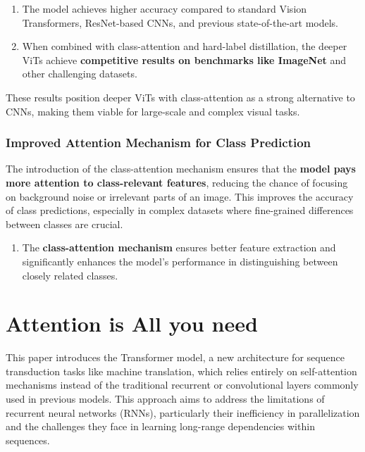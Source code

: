 \documentclass{report}
\begin{document}
	\begin{enumerate}
		\item 
		The model achieves higher accuracy compared to standard Vision Transformers, ResNet-based CNNs, and previous state-of-the-art models.
		
		\item 
		When combined with class-attention and hard-label distillation, the deeper ViTs achieve \textbf{competitive results on benchmarks like ImageNet} and other challenging datasets.
	\end{enumerate}
	These results position deeper ViTs with class-attention as a strong alternative to CNNs, making them viable for large-scale and complex visual tasks.
	
	
	
	\subsection{Improved Attention Mechanism for Class Prediction}
	The introduction of the class-attention mechanism ensures that the \textbf{model pays more attention to class-relevant features}, reducing the chance of focusing on background noise or irrelevant parts of an image. This improves the accuracy of class predictions, especially in complex datasets where fine-grained differences between classes are crucial.
	
	\begin{enumerate}
		\item 
		The \textbf{class-attention mechanism} ensures better feature extraction and significantly enhances the model's performance in distinguishing between closely related classes.
	\end{enumerate}
	
	
	
	
	
	
	
	
	
	
	
	
	\chapter{Attention is All you need \cite{DBLP:journals/corr/VaswaniSPUJGKP17}}
	This paper introduces the Transformer model, a new architecture for sequence transduction tasks like machine translation, which relies entirely on self-attention mechanisms instead of the traditional recurrent or convolutional layers commonly used in previous models. This approach aims to address the limitations of recurrent neural networks (RNNs), particularly their inefficiency in parallelization and the challenges they face in learning long-range dependencies within sequences.
	
\end{document}
